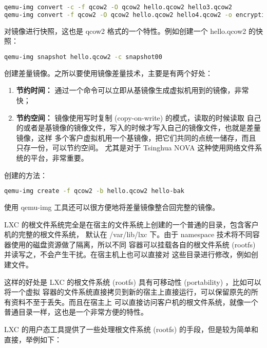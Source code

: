 \begin{lstlisting}[language=bash]
qemu-img convert -c -f qcow2 -O qcow2 hello.qcow2 hello3.qcow2
qemu-img convert -f qcow2 -O qcow2 hello.qcow2 hello4.qcow2 -o encryption
\end{lstlisting}

对镜像进行快照，这也是 qcow2 格式的一个特性。例如创建一个 hello.qcow2 的快照：

\begin{lstlisting}[language=bash]
qemu-img snapshot hello.qcow2 -c snapshot00
\end{lstlisting}

创建差量镜像。之所以要使用镜像差量技术，主要是有两个好处：

\begin{enumerate}
    \item \textbf{节约时间：} 通过一个命令可以立即从基镜像生成虚拟机用到的镜像，非常快；
    \item \textbf{节约空间：} 镜像使用写时复制 (copy-on-write) 的模式，读取的时候读取
    自己的或者是基镜像的镜像文件，写入的时候才写入自己的镜像文件，也就是差量镜像，这样
    多个客户虚拟机用一个基镜像，把它们共同的点统一储存，而且只存一份，可以节约空间。
    尤其是对于 Tsinghua NOVA 这种使用网络文件系统的平台，非常重要。
\end{enumerate}

创建的方法：

\begin{lstlisting}[language=bash]
qemu-img create -f qcow2 -b hello.qcow2 hello-bak
\end{lstlisting}

使用 qemu-img 工具还可以很方便地将差量镜像整合回完整的镜像。

\label{subsubsubsec:rootfs-lxc}

LXC 的根文件系统完全是在宿主的文件系统上创建的一个普通的目录，包含客户机的完整的根文件系统，
默认在 /var/lib/lxc 下。由于 namespace 技术将不同容器使用的磁盘资源做了隔离，所以不同
容器可以挂载各自的根文件系统 (rootfs) 并读写之，不会产生干扰。在宿主机上也可以直接对
这些目录进行修改，例如创建文件。

这样的好处是 LXC 的根文件系统 (rootfs) 具有可移动性 (portability) ，比如可以将一个虚拟
容器的文件系统直接拷贝到新的宿主上直接运行，可以保留原先的所有资料不至于丢失。而且在宿主上
可以直接访问客户机的根文件系统，就像一个普通目录一样，这也是一个非常方便的特性。

LXC 的用户态工具提供了一些处理根文件系统 (rootfs) 的手段，但是较为简单和直接，举例如下：

